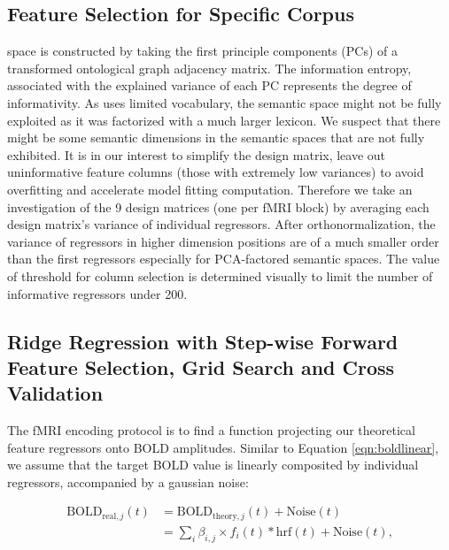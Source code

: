 \subsection{Feature Selection for Specific Corpus}

 space is constructed by taking the first principle components (PCs) of a transformed ontological graph adjacency matrix. The information entropy, associated with the explained variance of each PC represents the degree of informativity. As  uses limited vocabulary, the semantic space might not be fully exploited as it was factorized with a much larger lexicon. We suspect that there might be some semantic dimensions in the semantic spaces that are not fully exhibited. It is in our interest to simplify the design matrix, leave out uninformative feature columns (those with extremely low variances) to avoid overfitting and accelerate model fitting computation. Therefore we take an investigation of the 9 design matrices (one per fMRI block) by averaging each design matrix's variance of individual regressors. After orthonormalization, the variance of regressors in higher dimension positions are of a much smaller order than the first regressors especially for PCA-factored semantic spaces. The value of threshold for column selection is determined visually to limit the number of informative regressors under 200.

\subsection{Ridge Regression with Step-wise Forward Feature Selection, Grid Search and Cross Validation}
\label{sec:ridgemethod}
The fMRI encoding protocol is to find a function projecting our theoretical feature regressors onto BOLD amplitudes. Similar to Equation \ref{eqn:boldlinear}, we assume that the target BOLD value is linearly composited by individual regressors, accompanied by a gaussian noise:

\begin{equation}
    \begin{split}
    \text{BOLD}_{\text{real}, j}(t) &= \text{BOLD}_{\text{theory}, j}(t) + \text{Noise}(t) \\
    &= \sum_i {\beta_{i,j} \times f_{i}(t) * \text{hrf}(t)} + \text{Noise}(t),
    \end{split}
\label{eqn:boldglm}
\end{equation}

